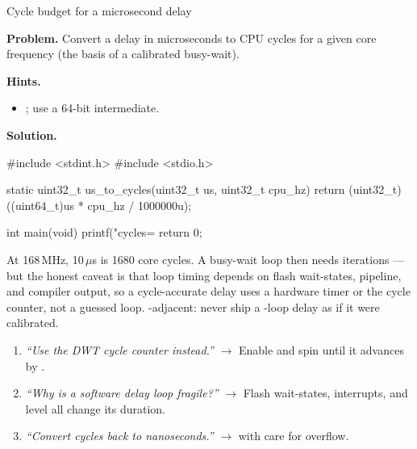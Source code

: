 \begin{gymproblem}{Cycle budget for a microsecond delay}

\textbf{Problem.} Convert a delay in microseconds to CPU cycles for a given
core frequency (the basis of a calibrated busy-wait).

\textbf{Hints.}
\begin{itemize}
\item {}; use a 64-bit intermediate.
\end{itemize}

\attempt

\textbf{Solution.}
\begin{cgym}
#include <stdint.h>
#include <stdio.h>

static uint32_t us_to_cycles(uint32_t us, uint32_t cpu_hz) {
    return (uint32_t)((uint64_t)us * cpu_hz / 1000000u);
}

int main(void) {
    printf("cycles=%
    return 0;
}
\end{cgym}

At 168\,MHz, 10\,$\mu$s is 1680 core cycles. A busy-wait loop then needs
 iterations --- but the honest
caveat is that loop timing depends on flash wait-states, pipeline, and compiler
output, so a cycle-accurate delay uses a hardware timer or the 
cycle counter, not a guessed loop. \trap-adjacent: never ship a
-loop  delay as if it were calibrated.

\followups
\begin{enumerate}
\item \emph{``Use the DWT cycle counter instead.''} $\rightarrow$ Enable
   and spin until it advances by .
\item \emph{``Why is a software delay loop fragile?''} $\rightarrow$ Flash
  wait-states, interrupts, and  level all change its duration.
\item \emph{``Convert cycles back to nanoseconds.''} $\rightarrow$
   with care for overflow.
\end{enumerate}
\end{gymproblem}

